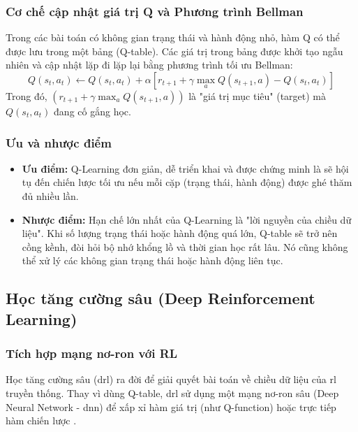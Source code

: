 \subsubsection{Cơ chế cập nhật giá trị Q và Phương trình Bellman}
Trong các bài toán có không gian trạng thái và hành động nhỏ, hàm Q có thể được lưu
trong một bảng (Q-table). Các giá trị trong bảng được khởi tạo ngẫu nhiên và cập
nhật lặp đi lặp lại bằng phương trình tối ưu Bellman:
\begin{equation}
    Q(s_{t}, a_{t}) \leftarrow Q(s_{t}, a_{t}) + \alpha [r_{t+1}+ \gamma \max_{a}
    Q(s_{t+1}, a) - Q(s_{t}, a_{t})]
\end{equation}
Trong đó, $(r_{t+1}+ \gamma \max_{a}Q(s_{t+1}, a))$ là "giá trị mục tiêu" (target)
mà $Q(s_{t}, a_{t})$ đang cố gắng học.

\subsubsection{Ưu và nhược điểm}
\begin{itemize}
    \item \textbf{Ưu điểm:} Q-Learning đơn giản, dễ triển khai và được chứng minh
        là sẽ hội tụ đến chiến lược tối ưu nếu mỗi cặp (trạng thái, hành động)
        được ghé thăm đủ nhiều lần.

    \item \textbf{Nhược điểm:} Hạn chế lớn nhất của Q-Learning là "lời nguyền của
        chiều dữ liệu". Khi số lượng trạng thái hoặc hành động quá lớn, Q-table
        sẽ trở nên cồng kềnh, đòi hỏi bộ nhớ khổng lồ và thời gian học rất lâu.
        Nó cũng không thể xử lý các không gian trạng thái hoặc hành động liên
        tục.
\end{itemize}

\subsection{Học tăng cường sâu (Deep Reinforcement Learning)}
\subsubsection{Tích hợp mạng nơ-ron với RL}
Học tăng cường sâu (\ac{drl}) ra đời để giải quyết bài toán về chiều dữ liệu của
\ac{rl} truyền thống. Thay vì dùng Q-table, \ac{drl} sử dụng một mạng nơ-ron sâu
(Deep Neural Network - \ac{dnn}) để xấp xỉ hàm giá trị (như Q-function) hoặc trực
tiếp hàm chiến lược \cite{Mnih2015}.

